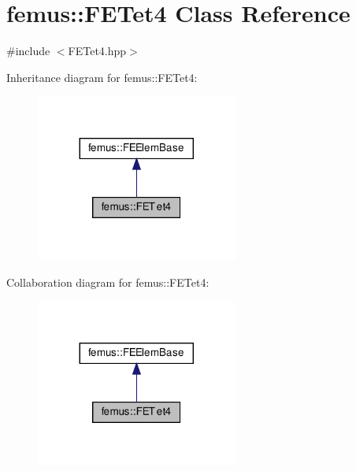 \hypertarget{classfemus_1_1_f_e_tet4}{}\section{femus\+:\+:F\+E\+Tet4 Class Reference}
\label{classfemus_1_1_f_e_tet4}


{\ttfamily \#include $<$F\+E\+Tet4.\+hpp$>$}



Inheritance diagram for femus\+:\+:F\+E\+Tet4\+:
\nopagebreak
\begin{figure}[H]
\begin{center}
\leavevmode
\includegraphics[width=188pt]{classfemus_1_1_f_e_tet4__inherit__graph}
\end{center}
\end{figure}


Collaboration diagram for femus\+:\+:F\+E\+Tet4\+:
\nopagebreak
\begin{figure}[H]
\begin{center}
\leavevmode
\includegraphics[width=188pt]{classfemus_1_1_f_e_tet4__coll__graph}
\end{center}
\end{figure}
